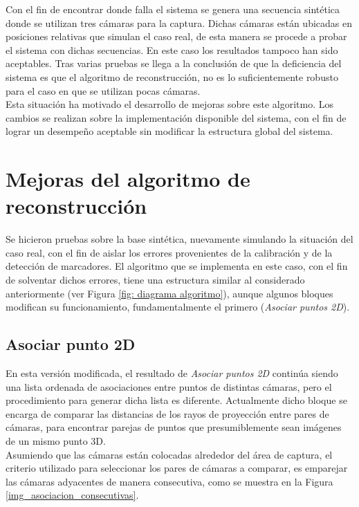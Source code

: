 Con el fin de encontrar donde falla el sistema se genera una secuencia sintética donde se utilizan tres cámaras para la captura. Dichas cámaras están ubicadas en posiciones relativas que simulan el caso real, de esta manera se procede a probar el sistema con dichas secuencias.  En este caso los resultados tampoco han sido aceptables. Tras varias pruebas se llega  a la conclusión de que la deficiencia del sistema es que el algoritmo de reconstrucción, no es lo suficientemente robusto para el caso en que se utilizan pocas cámaras.\\
Esta situación ha motivado el desarrollo de mejoras sobre este algoritmo. Los cambios se realizan sobre la implementación disponible del sistema, con el fin de lograr un desempeño aceptable sin modificar la estructura global del sistema.

\section{Mejoras del algoritmo de reconstrucción}


Se hicieron pruebas sobre la base sintética, nuevamente simulando la situación del caso real, con el fin de aislar los errores provenientes de la calibración y de la detección de marcadores.
El algoritmo que se implementa en este caso, con el fin de solventar dichos errores, tiene una estructura similar al considerado anteriormente (ver Figura \ref{fig: diagrama algoritmo}), aunque algunos bloques modifican su funcionamiento, fundamentalmente el primero (\emph{Asociar puntos 2D}).

\subsection{Asociar punto 2D}

En esta versión modificada, el resultado de \emph{Asociar puntos 2D} continúa siendo una lista ordenada de asociaciones entre puntos de distintas cámaras, pero el procedimiento para generar dicha lista es diferente. Actualmente dicho bloque se encarga  de comparar  las distancias de los rayos de proyección entre pares de cámaras, para encontrar parejas de puntos que presumiblemente sean imágenes de un mismo punto 3D.\\  

Asumiendo que las cámaras están colocadas alrededor del área de captura, el criterio utilizado para seleccionar los pares de cámaras a comparar, es emparejar las cámaras adyacentes de manera consecutiva, como se muestra en la Figura \ref{img_asociacion_consecutivas}.\\

